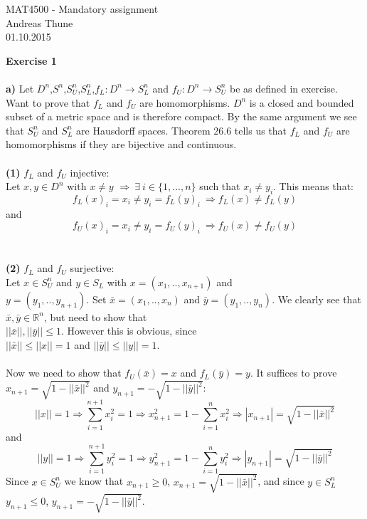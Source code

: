 \documentclass[11pt,a4paper]{report}
\begin{document}
\begin{center}
\LARGE MAT4500 - Mandatory assignment 
\\
Andreas Thune
\\
\LARGE
01.10.2015

\end{center}
\Large \textbf{Exercise 1} \Large
\\
\\
\textbf{a)} Let $D^n$,$S^n$,$S_U^n$,$S_L^n$,$f_L:D^n \rightarrow S_L^n$ and $f_U:D^n \rightarrow S_U^n$ be as defined in exercise. Want to prove that $f_L$ and $f_U$ are homomorphisms. $D^n$ is a closed and bounded subset of a metric space and is therefore compact. By the same argument we see that $S_U^n$ and $S_L^n$ are Hausdorff spaces. Theorem 26.6 tells us that $f_L$ and $f_U$ are homomorphisms if they are bijective and continuous.
\\
\\
\textbf{(1)} $f_L$ and $f_U$ injective:
\\
Let $x,y \in D^n$ with $x\neq y$ $\Rightarrow \ \exists \ i \in \{1,...,n\}$ such that $ x_i\neq y_i$. This means that: $$f_L(x)_i=x_i\neq y_i=f_L(y)_i \ \Rightarrow f_L(x)\neq f_L(y)$$ and $$f_U(x)_i=x_i\neq y_i=f_U(y)_i \ \Rightarrow f_U(x)\neq f_U(y)$$
\\
\\
\textbf{(2)} $f_L$ and $f_U$ surjective:
\\
Let $x \in S_U^n$ and $y \in S_L$ with $x=(x_1,..,x_{n+1})$ and \\ $y=(y_1,..,y_{n+1})$. Set $\bar{x}=(x_1,..,x_n)$ and $\bar{y}=(y_1,..,y_n)$. We clearly see that $\bar{x},\bar{y} \in \mathbb{R}^n $, but need to show that \\ $||\bar{x}||,||\bar{y}||\leq1$. However this is obvious, since \\ $||\bar{x}||\leq ||x||=1 $ and $||\bar{y}||\leq ||y||=1 $. 
\\
\\
Now we need to show that $f_U(\bar{x})=x$ and $f_L(\bar{y})=y$. It suffices to prove $x_{n+1}=\sqrt{1-||\bar{x}||^2}$ and  $y_{n+1}=-\sqrt{1-||\bar{y}||^2}$: $$||x||=1 \Rightarrow   \sum_{i=1}^{n+1}x_i^2 = 1 \Rightarrow x_{n+1}^2=1-\sum_{i=1}^{n}x_i^2 \Rightarrow |x_{n+1}|=\sqrt{1-||\bar{x}||^2}$$ and $$||y||=1 \Rightarrow   \sum_{i=1}^{n+1}y_i^2 = 1 \Rightarrow y_{n+1}^2=1-\sum_{i=1}^{n}y_i^2 \Rightarrow |y_{n+1}|=\sqrt{1-||\bar{y}||^2}$$ Since $x \in S_U^n$ we know that $x_{n+1}\geq0$, $  x_{n+1}=\sqrt{1-||\bar{x}||^2}$, and since $y \in S_L^n$ $y_{n+1}\leq0$, $  y_{n+1}=-\sqrt{1-||\bar{y}||^2}$. 
\end{document}
